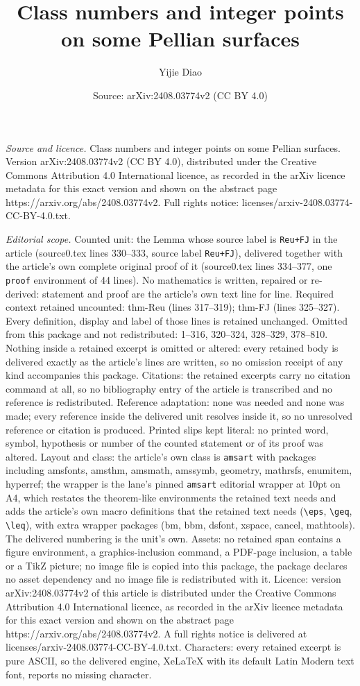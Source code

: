 \documentclass[10pt,a4paper]{amsart}
\title[Class numbers and integer points on some Pellian surfaces]{Class numbers and integer points on some Pellian surfaces}
\author{Yijie Diao}
\date{Source: arXiv:2408.03774v2 (CC BY 4.0)}
\begin{document}
\maketitle

\noindent\emph{Source and licence.} Class numbers and integer points on some Pellian surfaces. Version arXiv:2408.03774v2 (CC BY 4.0), distributed under the Creative Commons Attribution 4.0 International licence, as recorded in the arXiv licence metadata for this exact version and shown on the abstract page https://arxiv.org/abs/2408.03774v2. Full rights notice: licenses/arxiv-2408.03774-CC-BY-4.0.txt.\par\smallskip

\noindent\textit{Editorial scope.} Counted unit: the Lemma whose source label is \texttt{Reu+FJ} in the article (source0.tex lines 330--333, source label \texttt{Reu+FJ}), delivered together with the article's own complete original proof of it (source0.tex lines 334--377, one \texttt{proof} environment of 44 lines). No mathematics is written, repaired or re-derived: statement and proof are the article's own text line for line. Required context retained uncounted: thm-Reu (lines 317--319); thm-FJ (lines 325--327). Every definition, display and label of those lines is retained unchanged. Omitted from this package and not redistributed: 1--316, 320--324, 328--329, 378--810. Nothing inside a retained excerpt is omitted or altered: every retained body is delivered exactly as the article's lines are written, so no omission receipt of any kind accompanies this package. Citations: the retained excerpts carry no citation command at all, so no bibliography entry of the article is transcribed and no reference is redistributed. Reference adaptation: none was needed and none was made; every reference inside the delivered unit resolves inside it, so no unresolved reference or citation is produced. Printed slips kept literal: no printed word, symbol, hypothesis or number of the counted statement or of its proof was altered. Layout and class: the article's own class is \texttt{amsart} with packages including amsfonts, amsthm, amsmath, amssymb, geometry, mathrsfs, enumitem, hyperref; the wrapper is the lane's pinned \texttt{amsart} editorial wrapper at 10pt on A4, which restates the theorem-like environments the retained text needs and adds the article's own macro definitions that the retained text needs (\texttt{\textbackslash eps}, \texttt{\textbackslash geq}, \texttt{\textbackslash leq}), with extra wrapper packages (bm, bbm, dsfont, xspace, cancel, mathtools). The delivered numbering is the unit's own. Assets: no retained span contains a figure environment, a graphics-inclusion command, a PDF-page inclusion, a table or a TikZ picture; no image file is copied into this package, the package declares no asset dependency and no image file is redistributed with it. Licence: version arXiv:2408.03774v2 of this article is distributed under the Creative Commons Attribution 4.0 International licence, as recorded in the arXiv licence metadata for this exact version and shown on the abstract page https://arxiv.org/abs/2408.03774v2. A full rights notice is delivered at licenses/arxiv-2408.03774-CC-BY-4.0.txt. Characters: every retained excerpt is pure ASCII, so the delivered engine, XeLaTeX with its default Latin Modern text font, reports no missing character.
\end{document}
